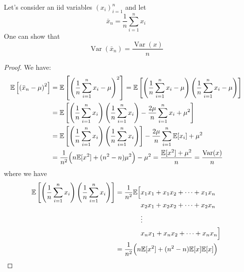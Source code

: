 \begin{lemma}
    \label{lem:sample-var}
    Let's consider an iid variables $(x_i)^n_{i=1}$ and let 
    \begin{equation*}
        \bar{x}_n = \frac{1}{n}\sum^n_{i=1} x_i
    \end{equation*}
    One can show that 
    \begin{equation*}
        \operatorname{Var}(\bar{x}_n) = \frac{\operatorname{Var}(x)}{n}
    \end{equation*}
\end{lemma}
\begin{proof}
    We have:
    \begin{equation*}
    \begin{aligned}
        \mathbb{E}\left[ \left( \bar{x}_n - \mu \right)^2 \right] &= \mathbb{E}\left[ \left( \frac{1}{n}\sum^n_{i=1}x_i - \mu \right)^2 \right] = \mathbb{E}\left[ \left( \frac{1}{n}\sum^n_{i=1} x_i - \mu \right)\left( \frac{1}{n}\sum^n_{i=1} x_i - \mu \right) \right] \\
        &= \mathbb{E}\left[ \left( \frac{1}{n}\sum^n_{i=1} x_i \right)\left( \frac{1}{n}\sum^n_{i=1} x_i \right) - \frac{2\mu}{n}\sum^n_{i=1} x_i + \mu^2  \right] \\
        &= \mathbb{E}\left[ \left( \frac{1}{n}\sum^n_{i=1} x_i \right)\left( \frac{1}{n}\sum^n_{i=1} x_i \right) \right] - \frac{2\mu}{n}\sum^n_{i=1}\mathbb{E}[x_i] + \mu^2 \\
        &= \frac{1}{n^2}\Big(n\mathbb{E}[x^2] + (n^2-n)\mu^2\Big) - \mu^2 = \frac{\mathbb{E}[x^2] + \mu^2}{n} = \frac{\operatorname{Var}(x)}{n}
    \end{aligned}
    \end{equation*}
    where we have
    \begin{equation*}
    \begin{aligned}
        \mathbb{E}\left[ \left( \frac{1}{n}\sum^n_{i=1} x_i \right)\left( \frac{1}{n}\sum^n_{i=1} x_i \right) \right] &= \frac{1}{n^2}\begin{aligned}[t]
            \mathbb{E}\Big[&x_1x_1 + x_1x_2 + \cdots + x_1x_n \\
            &x_2x_1 + x_2x_2 + \cdots + x_2x_n \\
            &\vdots \\
            &x_nx_1 + x_nx_2 + \cdots + x_nx_n \Big]    
        \end{aligned} \\
        &= \frac{1}{n^2}\Big(n\mathbb{E}[x^2] + (n^2-n)\mathbb{E}[x]\mathbb{E}[x]\Big)
    \end{aligned}
    \end{equation*}
\end{proof}

